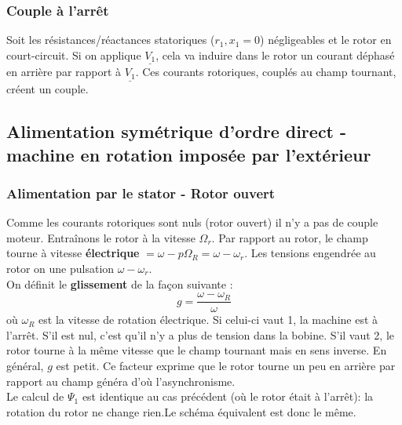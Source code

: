 		\subsubsection{Couple à l’arrêt}
		Soit les résistances/réactances statoriques ($r_1,x_1=0$) négligeables et
		le rotor en court-circuit. Si on applique $\underline{V_1}$, cela va induire 
		dans le rotor un courant déphasé en arrière par rapport à $\underline{V_1}$. 
		Ces courants rotoriques, couplés au champ tournant, créent un couple.
		
		
	\subsection{Alimentation symétrique d'ordre direct - machine en rotation imposée 
	par l'extérieur}
		\subsubsection{Alimentation par le stator - Rotor ouvert}
		Comme les courants rotoriques sont nuls (rotor ouvert) il  n'y a pas de couple 
		moteur. Entraînons le rotor à la vitesse $\Omega_r$. Par rapport au rotor, le 
		champ tourne à vitesse \textbf{électrique} $= \omega-p\Omega_R = \omega-\omega_r$. 
		Les tensions engendrée au rotor on une pulsation $\omega-\omega_r$.\\		
		On définit le \textbf{glissement} de la façon suivante :
		\begin{equation}
		g = \dfrac{\omega-\omega_R}{\omega}
		\end{equation}
		où $\omega_R$ est la vitesse de rotation électrique. Si celui-ci vaut 1, 
		la machine est à l'arrêt. S'il est nul, c'est qu'il n'y a plus de tension 
		dans la bobine. S'il vaut 2, le rotor tourne à la même vitesse que le champ 
		tournant mais en sens inverse. En général, $g$ est petit. Ce facteur exprime 
		que le rotor tourne un peu en arrière par rapport au champ généra d’où 
		l'asynchronisme.\\
		
		Le calcul de $\Psi_1$ est identique au cas précédent (où le rotor était à 
		l'arrêt): la rotation du rotor ne change rien.Le schéma équivalent est donc 
		le même.\\

